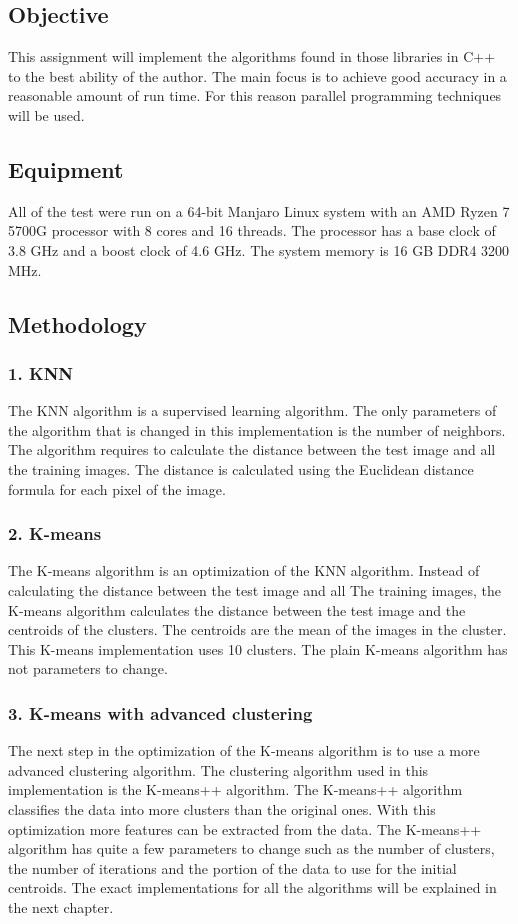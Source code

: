 \subsection*{Objective}

This assignment will implement the algorithms found in those libraries in C++ to the best ability of the author. The main focus
is to achieve good accuracy in a reasonable amount of run time. For this reason parallel programming techniques will be used.

\subsection*{Equipment}

All of the test were run on a 64-bit Manjaro Linux system with an AMD Ryzen 7 5700G processor with 8 cores and 16 threads. The
processor has a base clock of 3.8 GHz and a boost clock of 4.6 GHz. The system memory is 16 GB DDR4 3200 MHz.

\subsection*{Methodology}
\subsubsection{1. KNN}

The KNN algorithm is a supervised learning algorithm. The only parameters of the algorithm that is changed in this implementation
is the number of neighbors. The algorithm requires to calculate the distance between the test image and all the training images. The
distance is calculated using the Euclidean distance formula for each pixel of the image.

\subsubsection{2. K-means}

The K-means algorithm is an optimization of the KNN algorithm. Instead of calculating the distance between the test image and all The
training images, the K-means algorithm calculates the distance between the test image and the centroids of the clusters. The centroids
are the mean of the images in the cluster. This K-means implementation uses 10 clusters. The plain K-means algorithm has not parameters
to change.


\subsubsection{3. K-means with advanced clustering}

The next step in the optimization of the K-means algorithm is to use a more advanced clustering algorithm. The clustering algorithm used
in this implementation is the K-means++ algorithm. The K-means++ algorithm classifies the data into more clusters than the original ones.
With this optimization more features can be extracted from the data. The K-means++ algorithm has quite a few parameters to change such as
the number of clusters, the number of iterations and the portion of the data to use for the initial centroids. The exact implementations 
for all the algorithms will be explained in the next chapter.